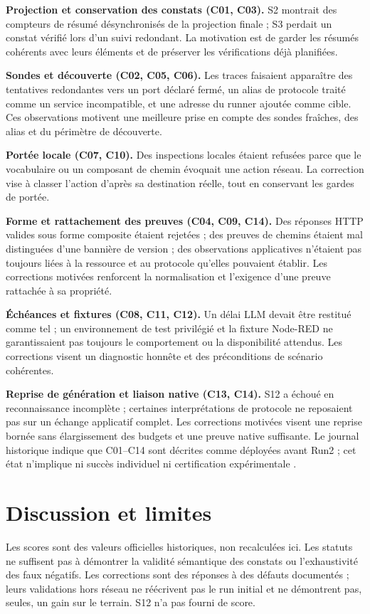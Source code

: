 \documentclass[11pt,a4paper]{article}
\begin{document}
\textbf{Projection et conservation des constats (C01, C03).} S2 montrait des compteurs de résumé désynchronisés de la projection finale ; S3 perdait un constat vérifié lors d'un suivi redondant. La motivation est de garder les résumés cohérents avec leurs éléments et de préserver les vérifications déjà planifiées.

\textbf{Sondes et découverte (C02, C05, C06).} Les traces faisaient apparaître des tentatives redondantes vers un port déclaré fermé, un alias de protocole traité comme un service incompatible, et une adresse du runner ajoutée comme cible. Ces observations motivent une meilleure prise en compte des sondes fraîches, des alias et du périmètre de découverte.

\textbf{Portée locale (C07, C10).} Des inspections locales étaient refusées parce que le vocabulaire ou un composant de chemin évoquait une action réseau. La correction vise à classer l'action d'après sa destination réelle, tout en conservant les gardes de portée.

\textbf{Forme et rattachement des preuves (C04, C09, C14).} Des réponses HTTP valides sous forme composite étaient rejetées ; des preuves de chemins étaient mal distinguées d'une bannière de version ; des observations applicatives n'étaient pas toujours liées à la ressource et au protocole qu'elles pouvaient établir. Les corrections motivées renforcent la normalisation et l'exigence d'une preuve rattachée à sa propriété.

\textbf{Échéances et fixtures (C08, C11, C12).} Un délai LLM devait être restitué comme tel ; un environnement de test privilégié et la fixture Node-RED ne garantissaient pas toujours le comportement ou la disponibilité attendus. Les corrections visent un diagnostic honnête et des préconditions de scénario cohérentes.

\textbf{Reprise de génération et liaison native (C13, C14).} S12 a échoué en reconnaissance incomplète ; certaines interprétations de protocole ne reposaient pas sur un échange applicatif complet. Les corrections motivées visent une reprise bornée sans élargissement des budgets et une preuve native suffisante. Le journal historique indique que C01–C14 sont décrites comme déployées avant Run2 ; cet état n'implique ni succès individuel ni certification expérimentale \cite{corrections,run2}.
\section{Discussion et limites}
Les scores sont des valeurs officielles historiques, non recalculées ici. Les statuts ne suffisent pas à démontrer la validité sémantique des constats ou l'exhaustivité des faux négatifs. Les corrections sont des réponses à des défauts documentés ; leurs validations hors réseau ne réécrivent pas le run initial et ne démontrent pas, seules, un gain sur le terrain. S12 n'a pas fourni de score.
\end{document}

